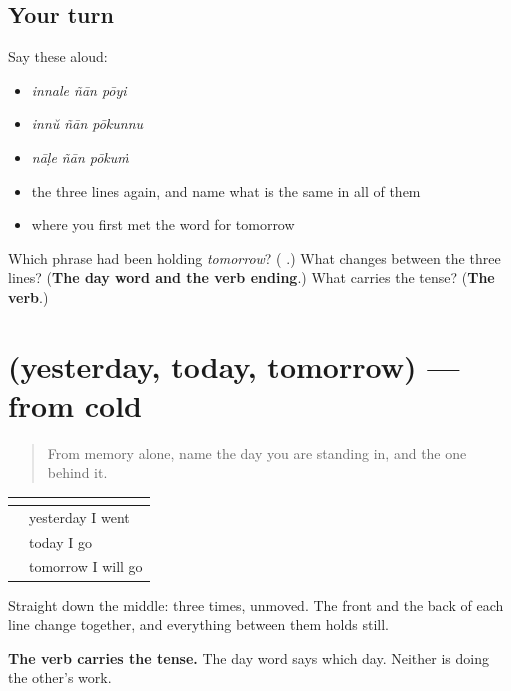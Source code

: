 \subsection*{Your turn}
Say these aloud:

\begin{itemize}
\raggedright
  \item \emph{innale ñān pōyi}
  \item \emph{innŭ ñān pōkunnu}
  \item \emph{nāḷe ñān pōkuṁ}
  \item the three lines again, and name what is the same in all of them
  \item where you first met the word for tomorrow
\end{itemize}

\begin{tcolorbox}[breakable,colback=teal!4,colframe=teal!35!black,title={Before you move on}]
Which phrase had been holding \emph{tomorrow}? (\textbf{ }.) What changes between the three lines? (\textbf{The day word and the verb ending}.) What carries the tense? (\textbf{The verb}.)
\end{tcolorbox}
\section[(yesterday, today, tomorrow)]{(yesterday, today, tomorrow) — from cold}

\label{lesson:ML-R94-day-recall}



\begin{quote}
From memory alone, name the day you are standing in, and the one behind it.
\end{quote}

\begin{grammarlens}[title={Grammar Lens: the three lines}]
\noindent
\begin{tabularx}{\linewidth}{@{}>{\raggedright\arraybackslash}X>{\raggedright\arraybackslash}X@{}}
\toprule
\textbf{} & \textbf{} \\
\midrule
\textbf{\ml{ഇന്നലെ} \ml{ഞാൻ} \ml{പോയി}} & yesterday I went \\
\textbf{\ml{ഇന്ന്} \ml{ഞാൻ} \ml{പോകുന്നു}} & today I go \\
\textbf{\ml{നാളെ} \ml{ഞാൻ} \ml{പോകും}} & tomorrow I will go \\
\bottomrule
\end{tabularx}

Straight down the middle: \textbf{} three times, unmoved. The front and the back of each line change together, and everything between them holds still.

\textbf{The verb carries the tense.} The day word says which day. Neither is doing the other's work.
\end{grammarlens}

